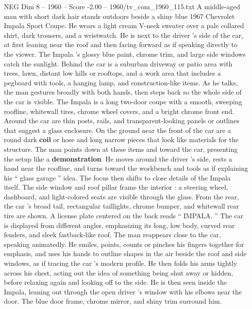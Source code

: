 \begin{textsample}{NEG Dim 8 – 1960 – Score -2.00 – 1960/tv\_com\_1960\_115.txt}  \label{ex:f8_neg_009}
A middle-aged man with short dark hair stands outdoors beside a shiny blue 1967 Chevrolet Impala Sport Coupe.
He wears a light cream V-neck sweater over a pale collared shirt, dark trousers, and a wristwatch.
He is next to the driver ’s side of the car, at first leaning near the roof and then facing forward as if speaking directly to the viewer.
The Impala ’s glossy blue paint, chrome trim, and large side windows catch the sunlight.
Behind the car is a suburban driveway or patio area with trees, lawn, distant low hills or rooftops, and a work area that includes a pegboard with tools, a hanging lamp, and construction-like items.
As he talks, the man gestures broadly with both hands, then steps back so the whole side of the car is visible.
The Impala is a long two-door coupe with a smooth, sweeping roofline, whitewall tires, chrome wheel covers, and a bright chrome front end.
Around the car are thin posts, rails, and transparent-looking panels or outlines that suggest a glass enclosure.
On the ground near the front of the car are a round dark \textbf{coil} or hose and long narrow pieces that look like materials for the structure.
The man points down at these items and toward the car, presenting the setup like a \textbf{demonstration}.
He moves around the driver ’s side, rests a hand near the roofline, and turns toward the workbench and tools as if explaining his “ glass garage ” idea.
The focus then shifts to close details of the Impala itself.
The side window and roof pillar frame the interior : a steering wheel, dashboard, and light-colored seats are visible through the glass.
From the rear, the car ’s broad tail, rectangular taillights, chrome bumper, and whitewall rear tire are shown.
A license plate centered on the back reads “ IMPALA. ” The car is displayed from different angles, emphasizing its long, low body, curved rear fenders, and sleek fastback-like roof.
The man reappears close to the car, speaking animatedly.
He smiles, points, counts or pinches his fingers together for emphasis, and uses his hands to outline shapes in the air beside the roof and side windows, as if tracing the car ’s modern profile.
He then folds his arms tightly across his chest, acting out the idea of something being shut away or hidden, before relaxing again and looking off to the side.
He is then seen inside the Impala, leaning out through the open driver ’s window with his elbows near the door.
The blue door frame, chrome mirror, and shiny trim surround him.

\end{textsample}
